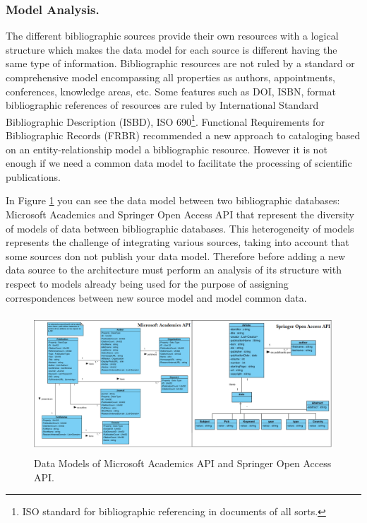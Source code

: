 \documentclass[11pt]{article}
\begin{document}
\subsubsection{Model Analysis.}

The different bibliographic sources provide their own resources with a logical structure which makes the data model for each source is different having the same type of information. Bibliographic resources are not ruled by a standard or comprehensive model encompassing all properties as authors, appointments, conferences, knowledge areas, etc. Some features such as DOI, ISBN, format bibliographic references of resources are ruled by International Standard Bibliographic Description (ISBD)\cite{barbaric2014isbd}, ISO 690\footnote{ISO standard for bibliographic referencing in documents of all sorts.}. Functional Requirements for Bibliographic Records (FRBR) \cite{Edward} recommended a new approach to cataloging based on an entity-relationship model a bibliographic resource. However it is not enough if we need a common data model to facilitate the processing of scientific publications.

In Figure \ref{fig:ModelMaSO} you can see the data model between two bibliographic databases: Microsoft Academics and Springer Open Access API  that represent the diversity of models of data between bibliographic databases. This heterogeneity of models represents the challenge of integrating various sources, taking into account that some sources don not publish your data model. Therefore before adding a new data source to the architecture must perform an analysis of its structure with respect to models already being used for the purpose of assigning correspondences between new source model   and model common data. \begin{figure}[ht!]
	\centering
		\includegraphics[height=5.2cm]{modelosMA_Springer.png}
	\caption{Data Models of Microsoft Academics API and Springer Open Access API.}
	\label{fig:ModelMaSO}
\end{figure}
\end{document}
